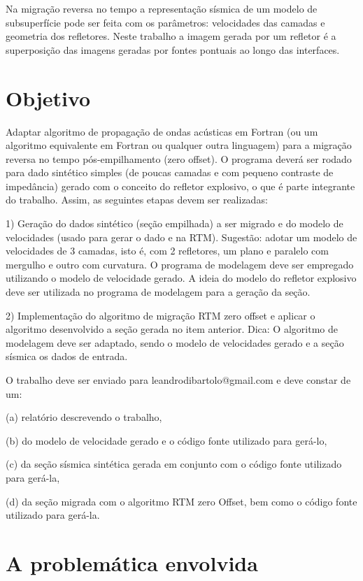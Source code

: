 \documentclass[12pt,a4paper,final]{report}%
\begin{document}
Na migração reversa no tempo a representação sísmica de um modelo de subsuperfície pode ser feita com os parâmetros: velocidades das camadas e geometria dos refletores. Neste trabalho a imagem gerada por um refletor é a superposição das imagens geradas por fontes pontuais ao longo das interfaces. 

\section*{Objetivo}

	 
	 Adaptar algoritmo de propagação de ondas acústicas em Fortran (ou um algoritmo equivalente em Fortran ou qualquer outra linguagem) para a migração
	 reversa no tempo pós-empilhamento (zero offset). O programa deverá ser rodado para dado sintético simples (de poucas
	 camadas e com pequeno contraste de impedância) gerado com o conceito do refletor explosivo, o que é parte integrante do trabalho.
	 Assim, as seguintes etapas devem ser realizadas:
	 
	 1) Geração do dados sintético (seção empilhada) a ser migrado e do modelo
	 de velocidades (usado para gerar o dado e na RTM). Sugestão: adotar um modelo de velocidades de 3 camadas, isto é, com 2 refletores, um plano e paralelo com
	 mergulho e outro com curvatura. O programa de modelagem deve ser empregado 	utilizando o modelo de velocidade gerado. A ideia do modelo do refletor explosivo
	 deve ser utilizada no programa de modelagem para a geração da seção.
	 
	 2) Implementação do algoritmo de migração RTM zero offset e aplicar o
	 algoritmo desenvolvido a seção gerada no item anterior. Dica: O algoritmo de modelagem deve ser adaptado, sendo o modelo de velocidades gerado e a seção
	 sísmica os dados de entrada.
	 
	 O trabalho deve ser enviado para leandrodibartolo@gmail.com e deve constar de um: 
	 
	 (a) relatório descrevendo o trabalho, 
	 
	 (b) do modelo de velocidade gerado e o código fonte utilizado para gerá-lo,
	 
	 (c) da seção 	sísmica sintética gerada em conjunto com o código fonte utilizado para gerá-la, 
	 	 
	 (d) da seção migrada com o algoritmo RTM zero Offset, bem como o código fonte utilizado para gerá-la.

\section*{A problemática envolvida}
\end{document}
